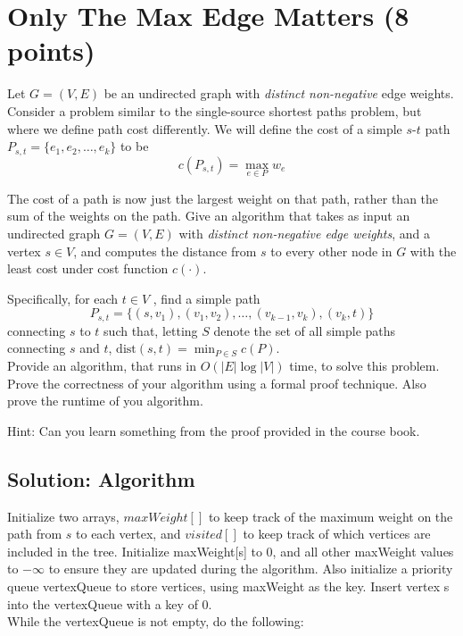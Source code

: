 \documentclass[letter,11pt]{article}
\begin{document}
\section{Only The Max Edge Matters (8 points)}

Let $G = (V, E)$ be an undirected graph with \emph{distinct non-negative} edge weights. Consider a problem similar to the single-source shortest paths problem, but where we define path cost differently. We will define the cost of a simple $s$-$t$ path $P_{s,t} = \{e_1, e_2, \ldots, e_k\}$ to be $$c(P_{s,t}) = \max_{e \in P} w_e$$

The cost of a path is now just the largest weight on that path, rather than the
sum of the weights on the path. Give an algorithm that takes as input an undirected
graph $G = (V, E)$ with \emph{distinct non-negative edge weights}, and a vertex $s \in V$, and
computes the distance from $s$ to every other node in $G$ with the least cost under cost
function $c(\cdot)$. 

Specifically, for each $t \in V$ , find a simple path $$P_{s,t} =
\{(s, v_1), (v_1, v_2), \dots, (v_{k-1}, v_k), (v_k, t)\}$$ connecting $s$ to $t$ such that, letting $S$ denote the set of all simple paths connecting $s$ and $t$, $\text{dist}(s, t) = \min_{P \in S} c(P)$. \\

Provide an algorithm, that runs in $O(|E| \log |V|)$ time, to solve this problem. Prove the correctness of your algorithm using a formal proof technique. Also prove the runtime of you algorithm.

Hint: Can you learn something from the proof provided in the course book.

\subsection{Solution: Algorithm}


Initialize two arrays, $maxWeight[]$ to keep track of the maximum weight on the path from $s$ to each vertex, and $visited[]$ to keep track of which vertices are included in the tree. Initialize maxWeight[s] to 0, and all other maxWeight values to $- \infty$ to ensure they are updated during the algorithm. Also initialize a priority queue vertexQueue to store vertices, using maxWeight as the key. Insert vertex s into the vertexQueue with a key of 0. \\

While the vertexQueue is not empty, do the following: \\
\end{document}

